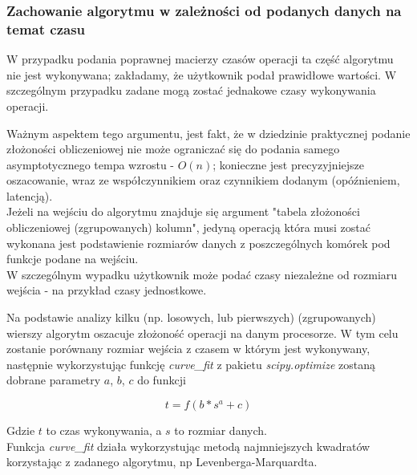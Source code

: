 \documentclass[brudnopis]{xmgr}
\begin{document}
\subsubsection{Zachowanie algorytmu w zależności od podanych danych na temat czasu}


W przypadku podania poprawnej macierzy czasów operacji ta część algorytmu nie jest wykonywana; zakładamy, że użytkownik podał prawidłowe wartości.
W szczególnym przypadku zadane mogą zostać jednakowe czasy wykonywania operacji.


Ważnym aspektem tego argumentu, jest fakt, że w dziedzinie praktycznej podanie złożoności obliczeniowej nie może ograniczać się do podania samego asymptotycznego tempa wzrostu - $O(n)$; konieczne jest precyzyjniejsze oszacowanie, wraz ze współczynnikiem oraz czynnikiem dodanym (opóźnieniem, latencją).
\medskip\\

Jeżeli na wejściu do algorytmu znajduje się argument "tabela złożoności obliczeniowej (zgrupowanych) kolumn", jedyną operacją która musi zostać wykonana jest podstawienie rozmiarów danych z poszczególnych komórek pod funkcje podane na wejściu.
\medskip\\

W szczególnym wypadku użytkownik może podać czasy niezależne od rozmiaru wejścia - na przykład czasy jednostkowe.
\medskip\\


Na podstawie analizy kilku (np. losowych, lub pierwszych) (zgrupowanych) wierszy algorytm oszacuje złożoność operacji na danym procesorze.
W tym celu zostanie porównany rozmiar wejścia z czasem w którym jest wykonywany, następnie wykorzystując funkcję \emph{curve\_fit} z pakietu \emph{scipy.optimize} zostaną dobrane parametry $a$, $b$, $c$ do funkcji

$$t = f(b * s^a + c)$$

Gdzie $t$ to czas wykonywania, a $s$ to rozmiar danych.
\medskip\\

Funkcja \emph{curve\_fit} działa wykorzystując metodą najmniejszych kwadratów korzystając z zadanego algorytmu, np Levenberga-Marquardta.\cite{LAVMAR:2005:X}
\medskip\\
\end{document}
